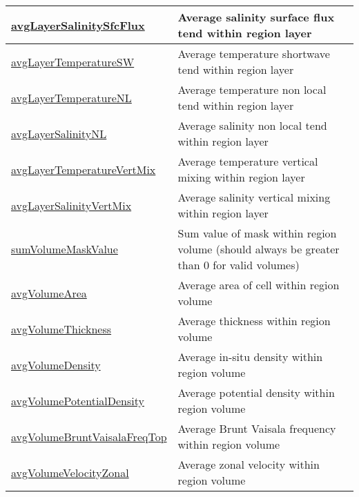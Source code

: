 {\begin{center}
\begin{longtable}{| p{2.0in} | p{4.0in} |}
    \hline
    \hyperref[subsec:var_sec_layerVolumeWeightedAverageAM_avgLayerSalinitySfcFlux]{avgLayerSalinitySfcFlux} & Average salinity surface flux tend within region layer \\
    \hline
    \hyperref[subsec:var_sec_layerVolumeWeightedAverageAM_avgLayerTemperatureSW]{avgLayerTemperatureSW} & Average temperature shortwave tend within region layer \\
    \hline
    \hyperref[subsec:var_sec_layerVolumeWeightedAverageAM_avgLayerTemperatureNL]{avgLayerTemperatureNL} & Average temperature non local tend within region layer \\
    \hline
    \hyperref[subsec:var_sec_layerVolumeWeightedAverageAM_avgLayerSalinityNL]{avgLayerSalinityNL} & Average salinity non local tend within region layer \\
    \hline
    \hyperref[subsec:var_sec_layerVolumeWeightedAverageAM_avgLayerTemperatureVertMix]{avgLayerTemperatureVertMix} & Average temperature vertical mixing within region layer \\
    \hline
    \hyperref[subsec:var_sec_layerVolumeWeightedAverageAM_avgLayerSalinityVertMix]{avgLayerSalinityVertMix} & Average salinity vertical mixing within region layer \\
    \hline
    \hyperref[subsec:var_sec_layerVolumeWeightedAverageAM_sumVolumeMaskValue]{sumVolumeMaskValue} & Sum value of mask within region volume (should always be greater than 0 for valid volumes) \\
    \hline
    \hyperref[subsec:var_sec_layerVolumeWeightedAverageAM_avgVolumeArea]{avgVolumeArea} & Average area of cell within region volume \\
    \hline
    \hyperref[subsec:var_sec_layerVolumeWeightedAverageAM_avgVolumeThickness]{avgVolumeThickness} & Average thickness within region volume \\
    \hline
    \hyperref[subsec:var_sec_layerVolumeWeightedAverageAM_avgVolumeDensity]{avgVolumeDensity} & Average in-situ density within region volume \\
    \hline
    \hyperref[subsec:var_sec_layerVolumeWeightedAverageAM_avgVolumePotentialDensity]{avgVolumePotentialDensity} & Average potential density within region volume \\
    \hline
    \hyperref[subsec:var_sec_layerVolumeWeightedAverageAM_avgVolumeBruntVaisalaFreqTop]{avgVolumeBruntVaisalaFreqTop} & Average Brunt Vaisala frequency within region volume \\
    \hline
    \hyperref[subsec:var_sec_layerVolumeWeightedAverageAM_avgVolumeVelocityZonal]{avgVolumeVelocityZonal} & Average zonal velocity within region volume \\

\end{longtable}
\end{center}}
